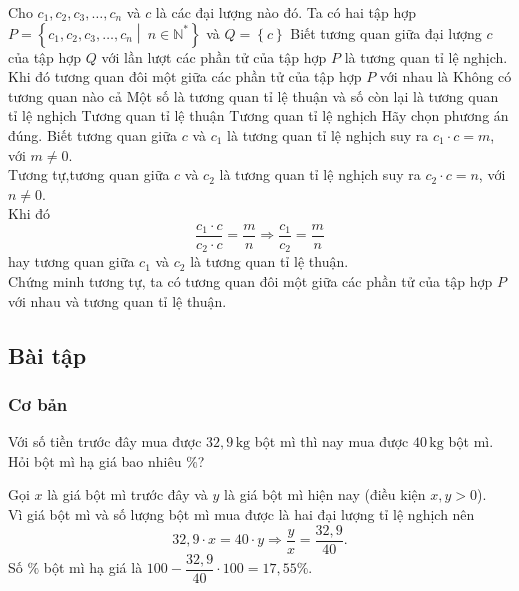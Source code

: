 \begin{vd}%
Cho $c_{1}, c_{2}, c_{3},\ldots, c_{n}$ và $c$ là các đại lượng nào đó. Ta có hai tập hợp $P = \left\{c_{1}, c_{2}, c_{3},\ldots, c_{n}\middle|\ n\in \mathbb{N}^{*}\right\}$ và $Q = \left\{c\right\}$ 
 Biết tương quan giữa đại lượng $c$ của tập hợp $Q$ với lần lượt các phần tử của tập hợp $P$ là tương quan tỉ lệ nghịch. Khi đó tương quan đôi một giữa các phần tử của tập hợp $P$ với nhau là 
 \choice
 {Không có tương quan nào cả}
 {Một số là tương quan tỉ lệ thuận và số còn lại là tương quan tỉ lệ nghịch}
 {\True Tương quan tỉ lệ thuận}
 {Tương quan tỉ lệ nghịch}
 Hãy chọn phương án đúng. 
  	\loigiai
	{Biết tương quan giữa $c$ và $c_{1}$ là tương quan tỉ lệ nghịch suy ra $c_{1}\cdot c = m$, với $m\neq 0$.\\
	Tương tự,tương quan giữa $c$ và $c_{2}$ là tương quan tỉ lệ nghịch suy ra $c_{2}\cdot c = n$, với $n\neq 0$.\\ 
   Khi đó		
   $$\dfrac{c_{1}\cdot c}{c_{2}\cdot c} = \dfrac{m}{n}\Rightarrow \dfrac{c_{1}}{c_{2}} = \dfrac{m}{n}$$
	hay tương quan giữa $c_{1}$ và $c_{2}$ là tương quan tỉ lệ thuận.\\
	Chứng minh tương tự, ta có tương quan đôi một giữa các phần tử của tập hợp $P$ với nhau và tương quan tỉ lệ thuận. 
	}
\end{vd}


\subsection{Bài tập}
\subsubsection{Cơ bản}
\begin{bt}%
Với số tiền trước đây mua được $32{,}9\, \mathrm{kg}$ bột mì thì nay mua được $40\, \mathrm{kg}$ bột mì. Hỏi bột mì hạ giá  bao nhiêu $\%$? 	
\loigiai
	{Gọi $x$ là giá bột mì trước đây và $y$ là giá bột mì hiện nay (điều kiện $x, y > 0$).\\
	Vì giá bột mì và số lượng bột mì mua được là hai đại lượng tỉ lệ nghịch nên
	  $$32{,}9\cdot x = 40\cdot y\Rightarrow \dfrac{y}{x} = \dfrac{32{,}9}{40}.$$
  Số $\%$ bột mì hạ giá là $100 - \dfrac{32{,}9}{40}\cdot 100 = 17{,}55\%$.  		
	
	}
\end{bt}


